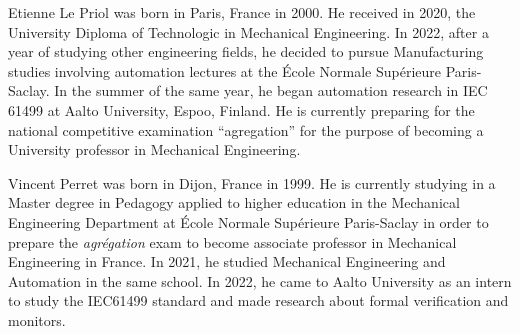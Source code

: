 \documentclass{ieeeojies}
\newcommand{\quotes}[1]{``#1''}
\begin{document}
\begin{IEEEbiography}{Etienne Le Priol} was born in Paris, France in 2000. He received in 2020, the University Diploma of Technologic in Mechanical Engineering. In 2022, after a year of studying other engineering fields, he decided to pursue Manufacturing studies involving automation lectures at the École Normale Supérieure Paris-Saclay. In the summer of the same year, he began automation research in IEC 61499 at Aalto University, Espoo, Finland. He is currently preparing for the national competitive examination \quotes{agregation} for the purpose of becoming a University professor in Mechanical Engineering.
\end{IEEEbiography}

\begin{IEEEbiography}{Vincent Perret} was born in Dijon, France in 1999. He is currently studying in a Master degree in Pedagogy applied to higher education in the Mechanical Engineering Department at École Normale Supérieure Paris-Saclay in order to prepare the \textit{agrégation} exam to become associate professor in Mechanical Engineering in France. In 2021, he studied Mechanical Engineering and Automation in the same school. In 2022, he came to Aalto University as an intern to study the IEC61499 standard and made research about formal verification and monitors.
\end{IEEEbiography}
\end{document}
